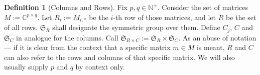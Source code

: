 \documentclass[a4paper]{amsart}
\theoremstyle{definition}
\newtheorem{defn}{Definition}
\DeclareMathOperator{\conv}{conv}
\newcommand{\lex}{\ensuremath{\prec}} %
\newcommand{\lr}[1]{\ensuremath{\left( #1 \right)}}
\newcommand{\lrM}[1]{\ensuremath{\left\{ #1 \right\}}}
\newcommand{\naturals}{\ensuremath{\mathbb{N}}}
\newcommand{\M}{\ensuremath{\mathcal{M}}}
\newcommand{\Sym}{\ensuremath{\mathfrak{S}}}
\begin{document}


\begin{defn}[Columns and Rows]
  Fix \(p, q \in \naturals^+\).  Consider the set of matrices \(M :=
  \mathbb{C}^{p \times q}\).  Let \(R_i := M_{i, *}\) be the \(i\)-th
  row of those matrices, and let \(R\) be the set of all rows.
  \(\Sym_R\) shall designate the symmetric group over them.  Define
  \(C_j\), \(C\) and \(\Sym_C\) in analogue for the columns.  Call
  \(\Sym_{R \times C} := \Sym_R \times \Sym_C\).  As an abuse of
  notation --- if it is clear from the context that a specific matrix
  \(m \in M\) is meant, \(R\) and \(C\) can also refer to the rows
  and columns of that specific matrix.  We will also usually supply \(p\)
  and \(q\) by context only.
\end{defn}



\end{document}
